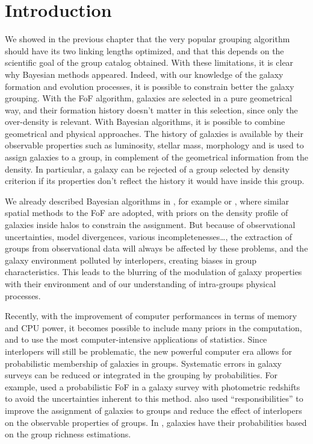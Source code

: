 \section{Introduction}
\label{sec:maggie_introduction}

\newcommand\rvir{r_{\rm vir}}
\newcommand\vvir{v_{\rm vir}}
\newcommand\pps{\emph{pps}}

We showed in the previous chapter that the very popular grouping algorithm
should have its two linking lengths optimized, and that this depends on the
scientific goal of the group catalog obtained. With these limitations, it is
clear why Bayesian methods appeared. Indeed, with our knowledge of the galaxy
formation and evolution processes, it is possible to constrain better the
galaxy grouping. With the FoF algorithm, galaxies are selected in a pure
geometrical way, and their formation history doesn't matter in this selection,
since only the over-density is relevant. With Bayesian algorithms, it is
possible to combine geometrical and physical approaches. The history of
galaxies is available by their observable properties such as luminosity,
stellar mass, morphology and is used to assign galaxies to a group, in
complement of the geometrical information from the density. In particular, a
galaxy can be rejected of a group selected by density criterion if its
properties don't reflect the history it would have inside this group.

We already described Bayesian algorithms in
, for example \citet{Yang+07} or
\citet{DominguezRomero+12}, where similar spatial methods to the FoF are
adopted, with priors on the density profile of galaxies inside halos to
constrain the assignment. But because of observational uncertainties, model
divergences, various incompletenesses\ldots, the extraction of groups from
observational data will always be affected by these problems, and the galaxy
environment polluted by interlopers, creating biases in group characteristics.
This leads to the blurring of the modulation of galaxy properties with their
environment and of our understanding of intra-groups physical processes.

Recently, with the improvement of computer performances in terms of memory and
CPU power, it becomes possible to include many priors in the computation, and
to use the most computer-intensive applications of statistics. Since
interlopers will still be problematic, the new powerful computer era allows for
probabilistic membership of galaxies in groups. Systematic errors in galaxy
surveys can be reduced or integrated in the grouping by probabilities. For
example, \citet{Liu+08} used a probabilistic FoF in a galaxy survey with
photometric redshifts to avoid the uncertainties inherent to this method.
\citet{DominguezRomero+12} also used ``responsibilities'' to improve the
assignment of galaxies to groups and reduce the effect of interlopers on the
observable properties of groups. In \citet{Rykoff+14}, galaxies have their
probabilities based on the group richness estimations.

